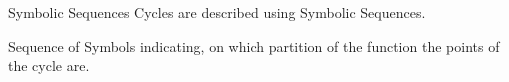 \begin{frame}{Symbolic Sequences}
    Cycles are described using Symbolic Sequences.

    Sequence of Symbols indicating, on which partition of the function the points of the cycle are.

\end{frame}

%
